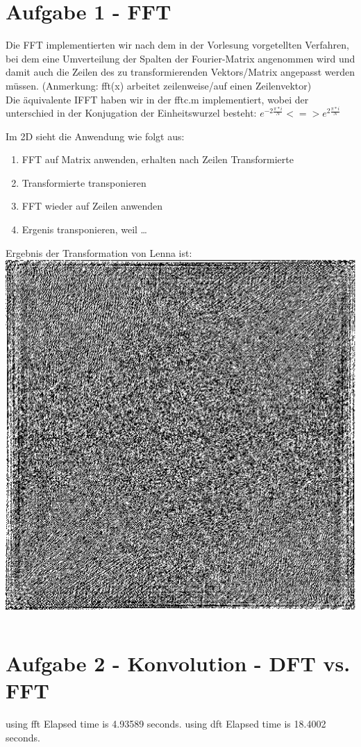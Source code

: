 




\newcommand{\nr}{2}
\lstset{language=matlab}


\section*{Aufgabe 1 - FFT}
Die FFT implementierten wir nach dem in der Vorlesung vorgetellten Verfahren,
bei dem eine Umverteilung der Spalten der Fourier-Matrix angenommen wird und
damit auch die Zeilen des zu transformierenden Vektors/Matrix angepasst werden
m\"ussen. (Anmerkung: fft(x) arbeitet zeilenweise/auf einen Zeilenvektor)\\


Die \"aquivalente IFFT haben wir in der fftc.m implementiert, wobei der
unterschied in der Konjugation der Einheitswurzel besteht: 
$e^{-2\frac{\pi*i}{N}} <=> e^{2\frac{\pi*i}{N}} $

Im 2D sieht die Anwendung wie folgt aus: 
\begin{enumerate}
\item FFT auf Matrix anwenden, erhalten nach Zeilen Transformierte
\item Transformierte transponieren
\item FFT wieder auf Zeilen anwenden
\item Ergenis transponieren, weil \ldots
\end{enumerate}


Ergebnis der Transformation von Lenna ist:\\
\includegraphics[width=150mm]{u02/f_out.eps}

\lstset{language=matlab}
\begin{lstlisting}[]
\end{lstlisting}

\section*{Aufgabe 2 - Konvolution - DFT vs. FFT} 


using fft
Elapsed time is 4.93589 seconds.
using dft
Elapsed time is 18.4002 seconds.


